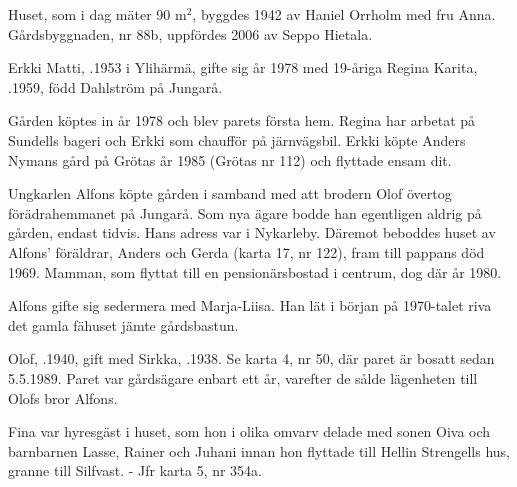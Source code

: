 Huset, som i dag mäter 90 m$^2$, byggdes 1942 av Haniel Orrholm med fru Anna. Gårdsbyggnaden, nr 88b, uppfördes 2006 av Seppo Hietala.


%
Erkki Matti, .1953 i Ylihärmä, gifte sig år 1978 med 19-åriga Regina Karita, .1959, född Dahlström på Jungarå.
\begin{jhchildren}
  \item {}
  \item {}
\end{jhchildren}
Gården köptes in år 1978 och blev parets första hem. Regina har arbetat på Sundells bageri och Erkki som chaufför på järnvägsbil. Erkki köpte Anders Nymans gård på Grötas år 1985 (Grötas nr 112) och flyttade ensam dit.


%
Ungkarlen Alfons köpte gården i samband med att brodern Olof övertog förädrahemmanet på Jungarå. Som nya ägare bodde han egentligen aldrig på gården, endast tidvis. Hans adress var i Nykarleby. Däremot beboddes huset av Alfons' föräldrar, Anders och Gerda (karta 17, nr 122), fram till pappans död 1969. Mamman, som flyttat till en pensionärsbostad i centrum, dog där år 1980.

Alfons gifte sig sedermera med Marja-Liisa. Han lät i början på 1970-talet riva det gamla fähuset jämte gårdsbastun.


%
Olof, .1940, gift med Sirkka, .1938. Se karta 4, nr 50, där paret är bosatt sedan 5.5.1989. Paret var gårdsägare enbart ett år, varefter de sålde lägenheten till Olofs bror Alfons.


%
Fina var hyresgäst i huset, som hon i olika omvarv delade med sonen Oiva och barnbarnen Lasse, Rainer och Juhani innan hon flyttade till Hellin Strengells hus, granne till Silfvast. - Jfr karta 5, nr 354a.


